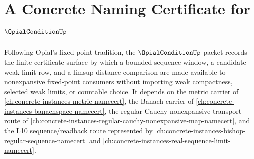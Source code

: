 \chapter{A Concrete Naming Certificate for $\OpialConditionUp$}
\label{ch:concrete-instances-opial-condition-namecert}

Following Opial's fixed-point tradition, the $\OpialConditionUp$ packet records the finite certificate surface by which a bounded sequence window, a candidate weak-limit row, and a limsup-distance comparison are made available to nonexpansive fixed-point consumers without importing weak compactness, selected weak limits, or countable choice. It depends on the metric carrier of \autoref{ch:concrete-instances-metric-namecert}, the Banach carrier of \autoref{ch:concrete-instances-banachspace-namecert}, the regular Cauchy nonexpansive transport route of \autoref{ch:concrete-instances-regular-cauchy-nonexpansive-map-namecert}, and the L10 sequence/readback route represented by \autoref{ch:concrete-instances-bishop-regular-sequence-namecert} and \autoref{ch:concrete-instances-real-sequence-limit-namecert}.

